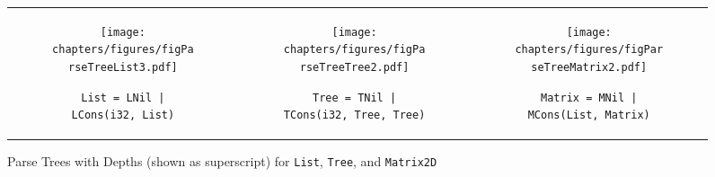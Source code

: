 \begin{figure}[t]
\begin{tabular}{ccc}
\begin{subfigure}[b]{0.32\textwidth}
\begin{center}
{\texttt{[image: chapters/figures/figParseTreeList3.pdf]}}
\end{center}
\caption{\label{fig:listParseTree}{\small\tt List = LNil | \newline LCons(i32, List)}}
\end{subfigure}%
&
\begin{subfigure}[b]{0.22\textwidth}
\begin{center}
{\texttt{[image: chapters/figures/figParseTreeTree2.pdf]}}
\vspace{10px}
\end{center}
\caption{\label{fig:treeParseTree}{\footnotesize\tt Tree = TNil | \newline TCons(i32, Tree, Tree)}}
\end{subfigure}%
&
\begin{subfigure}[b]{0.4\textwidth}
\begin{center}
{\texttt{[image: chapters/figures/figParseTreeMatrix2.pdf]}}
\end{center}
\caption{\label{fig:matrixParseTree}{\tt Matrix = MNil | \newline MCons(List, Matrix)}}
\end{subfigure}%
\\
\end{tabular}
\vspace{-12px}
\caption{\label{fig:parseTrees}Parse Trees with Depths (shown as superscript) for {\tt List}, {\tt Tree}, and {\tt Matrix2D}}
\end{figure}
